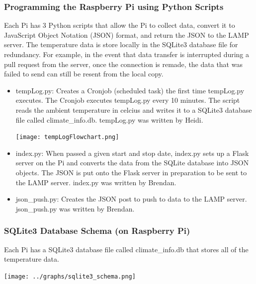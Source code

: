 \documentclass{article}
\begin{document}
			\subsubsection{Programming the Raspberry Pi using Python Scripts}
				Each Pi has 3 Python scripts that allow the Pi to collect data, convert it to JavaScript Object
				Notation (JSON) format, and return the JSON to the LAMP server. The temperature data is store locally
				in the SQLite3 database file for redundancy. For example, in the event that data transfer is interrupted
				during a pull request from the server, once the connection is remade, the data that was failed to send
				can still be resent from the local copy.

				\begin{itemize}
					\item tempLog.py: Creates a Cronjob (scheduled task) the first time tempLog.py executes. The Cronjob 
									  executes tempLog.py every 10 minutes. The script reads the ambient temperature
									  in celcius and writes it to a SQLite3 database file called climate\_info.db. tempLog.py was
									  written by Heidi.
						\begin{center}
							\texttt{[image: tempLogFlowchart.png]}\\
						\end{center}
						
					\item index.py: When passed a given start and stop date, index.py sets up a Flask server on the Pi and 
									converts the data from the SQLite database into JSON objects. The JSON is put onto the Flask server in
									preparation to be sent to the LAMP server. index.py was written by Brendan.
					\item json\_push.py: Creates the JSON post to push to data to the LAMP server. json\_push.py was written by Brendan.
				\end{itemize}
				
			\subsubsection{SQLite3 Database Schema (on Raspberry Pi)}	
				Each Pi has a SQLite3 database file called climate\_info.db that stores all of the temperature data.
				
				\begin{center}
					\texttt{[image: ../graphs/sqlite3\_schema.png]}
				\end{center}
			
\end{document}
